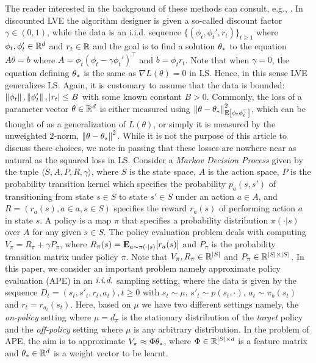 \begin{example}
\label{ex:ape}
The reader interested in the background of these methods can consult, e.g., \cite{sutton,Sze10}.
In discounted LVE the algorithm designer is given a so-called discount factor
 $\gamma\in (0,1)$, while the data is an i.i.d. sequence $\{(\phi_t,\phi_t',r_t)\}_{t\ge 1}$ where
$\phi_t,\phi_t'\in \mathbb{R}^d$ and $r_t\in \mathbb{R}$ and the goal is to find a solution $\theta_*$ to the equation $A \theta = b$
where $A = \phi_t(\phi_t - \gamma \phi_t')^\top$ and $b = \phi_t r_t$.
Note that when $\gamma=0$, the equation defining $\theta_*$ is the same as $\nabla L(\theta)=0$ in LS. 
Hence, in this sense LVE generalizes LS.
Again, it is customary to assume that the data is bounded: 
$\left\| \phi_t\right\|,\left\| \phi_t'\right\|,|r_t|\le B$ with some known 
constant $B>0$. 
Commonly, the loss of a parameter vector $\theta\in \mathbb{R}^d$ is either measured using $\left\| \theta-\theta_*\right\|_{\mathbf{E}\left[\phi_t \phi_t^\top\right]}^2$, which can be thought of as a generalization of $L(\theta)$, or simply it is measured by 
the unweighted $2$-norm, $\left\| \theta-\theta_*\right\|^2$. 
While it is not the purpose of this article to discuss these choices, we note in passing that these losses
are nowhere near as natural as the squared loss in LS.
Consider a \emph{Markov Decision Process} given by the tuple $\langle S,A,P,R,\gamma \rangle$, where $S$ is the state space, $A$ is the action space, $P$ is the probability transition kernel which specifies the probability $p_a(s,s')$ of transitioning from state $s\in S$ to state $s'\in S$ under an action $a\in A$, and $R=(r_a(s),a\in a,s\in S)$ specifies the reward $r_a(s)$ of performing action $a$ in state $s$. A policy is a map $\pi$ that specifies a probability distribution $\pi(\cdot | s)$ over $A$ for any given $s \in S$. The policy evaluation problem deals with computing $V_\pi=R_\pi+\gamma P_\pi$, where $R_\pi(s)=\mathbf{E}_{a\sim \pi(\cdot|s)}[r_a(s)]$ and $P_\pi$ is the probability transition matrix under policy $\pi$. Note that $V_\pi,R_\pi \in \mathbb{R}^{|S|}$ and $P_\pi\in\mathbb{R}^{|S|\times|S|}$. 
In this paper, we consider an important problem namely approximate policy evaluation (APE) in an $\emph{i.i.d.}$ sampling setting, where the data is given by the sequence  $D_t=(s_t,s'_t,r_t,a_t),t\geq 0$ with $s_t\sim \mu$,  $s'_t\sim p(s_t,\cdot)$, $a_t\sim\pi_b(s_t)$ and $r_t=r_{a_t}(s_t)$. Here, based on $\mu$ we have two different settings namely, the \emph{on-policy} setting where $\mu=d_{\pi}$ is the stationary distribution of  the \emph{target} policy and the \emph{off-policy} setting where $\mu$ is any arbitrary distribution. In the problem of APE, the aim is to approximate $V_\pi \approx \Phi \theta_*$, where $\Phi\in \mathbb{R}^{|S|\times d}$ is a feature matrix and $\theta_*\in\mathbb{R}^d$ is a weight vector to be learnt.

\end{example}
